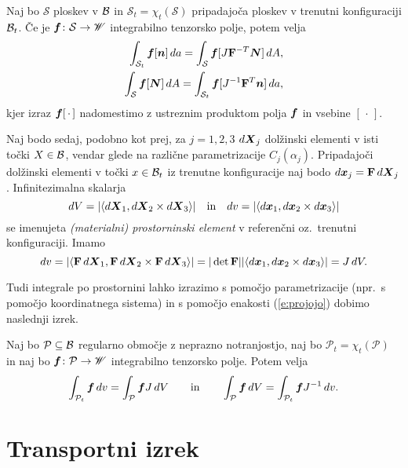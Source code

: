 \begin{izrek} \label{i:suittra}
	Naj bo $\mathcal{S}$ ploskev v $\mathcal B$ in $\mathcal{S}_t=\chi_t(\mathcal{S})$
	pripadajoča ploskev v trenutni konfiguraciji $\mathcal B_t$.
	Če je $\boldsymbol f\colon \mathcal{S}\to\mathscr W$ integrabilno tenzorsko polje, potem velja
	\begin{align*}
		\int_{\mathcal{S}_t}\boldsymbol f[\boldsymbol n]\,da=\int_{\mathcal{S}}\boldsymbol f[J\mathbf F^{-T}\boldsymbol N]\,dA ,\\
		\int_{\mathcal{S}}\boldsymbol f[\boldsymbol N]\,dA=\int_{\mathcal{S}_t}\boldsymbol f[J^{-1}\mathbf F^{T}\boldsymbol n]\,da,
	\end{align*}
	kjer izraz $\boldsymbol f[\,\cdot\,]$ nadomestimo z ustreznim produktom
	polja $\boldsymbol f$ in vsebine $[\,\cdot\,]$.
\end{izrek}

Naj bodo sedaj, podobno kot prej, za $j=1,2,3$ $d\boldsymbol X_j$
dolžinski elementi v isti točki $X\in\mathcal B$, vendar
glede na različne parametrizacije $C_j(\alpha_j)$.
Pripadajoči dolžinski elementi v točki $x\in\mathcal B_t$ iz trenutne konfiguracije naj bodo $d\boldsymbol x_j=\mathbf F\,d\boldsymbol X_j$.
Infinitezimalna skalarja
\[
	dV=|\langle d\boldsymbol X_1,d\boldsymbol X_2\times d\boldsymbol X_3\rangle|\quad\textrm{in}\quad
	dv=|\langle d\boldsymbol x_1,d\boldsymbol x_2\times d\boldsymbol x_3\rangle|
\]
se imenujeta \emph{(materialni) prostorninski element} v referenčni oz.~trenutni konfiguraciji.
Imamo
\begin{equation} \label{e:projojo}
	dv=|\langle \mathbf F\,d\boldsymbol X_1,\mathbf F\,d\boldsymbol X_2\times \mathbf F\,d\boldsymbol X_3\rangle|
	=|\det\mathbf F||\langle d\boldsymbol x_1,d\boldsymbol x_2\times d\boldsymbol x_3\rangle|
	=J\,dV.
\end{equation}

Tudi integrale po prostornini lahko izrazimo s pomočjo parametrizacije (npr.~s
pomočjo koordinatnega sistema) in s pomočjo enakosti (\ref{e:projojo}) dobimo
naslednji izrek.

\begin{izrek} \label{i:prointrel}
	Naj bo $\mathcal{P}\subseteq\mathcal B$ regularno območje z neprazno notranjostjo,
	naj bo $\mathcal{P}_t=\chi_t(\mathcal{P})$ in
	naj bo $\boldsymbol f\colon \mathcal{P} \to\mathscr W$ integrabilno tenzorsko polje. Potem velja
	\begin{equation*}
		\int_{\mathcal{P}_t}\boldsymbol f\,dv=\int_{\mathcal{P}}\boldsymbol fJ\,dV \qquad\textrm{in}\qquad
		\int_{\mathcal{P}}\boldsymbol f\,dV=\int_{\mathcal{P}_t}\boldsymbol fJ^{-1}\,dv.
	\end{equation*}
\end{izrek}


\section{Transportni izrek}


